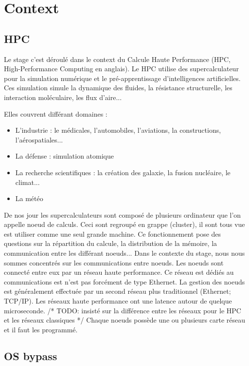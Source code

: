 \section{Context}

\subsection{HPC}

Le stage c'est déroulé dans le context du Calcule Haute Performance (HPC, High-Performance Computing en anglais).
Le HPC utilise des supercalculateur pour la simulation numérique et le pré-apprentissage d'intelligences artificielles.
Ces simulation simule la dynamique des fluides, la résistance structurelle, les interaction moléculaire, les flux d'aire...

\bigskip

Elles couvrent différant domaines :
\begin{itemize}
  \item L'industrie : le médicales, l'automobiles, l'aviations, la constructions, l'aérospatiales...
  \item La défense : simulation atomique
  \item La recherche scientifiques : la création des galaxie, la fusion nucléaire, le climat...
  \item La météo
\end{itemize}

\bigskip

De nos jour les supercalculateurs sont composé de plusieurs ordinateur que l'on appelle noeud de calculs.
Ceci sont regroupé en grappe (cluster), il sont tous vue est utiliser comme une seul grande machine.
Ce fonctionnement pose des questions sur la répartition du calcule, la distribution de la mémoire, la communication entre les différant noeuds...
Dans le contexte du stage, nous nous sommes concentrés sur les communications entre noeuds.
Les noeuds sont connecté entre eux par un réseau haute performance.
Ce réseau est dédiés au communications est n'est pas forcément de type Ethernet.
La gestion des noeuds est généralement effectuée par un second réseau plus traditionnel (Ethernet; TCP/IP).
Les réseaux haute performance ont une latence autour de quelque microseconde.
/* TODO: insisté sur la différence entre les réseaux pour le HPC et les réseaux classiques */
Chaque noeuds possède une ou plusieurs carte réseau et il faut les programmé.

\subsection{OS bypass}

